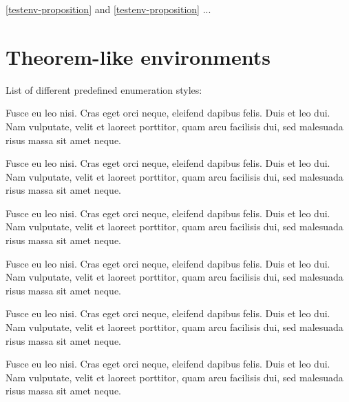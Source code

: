 \documentclass[a4paper,UKenglish,cleveref, autoref, thm-restate]{lipics-v2021}
\begin{document}
\cref{testenv-proposition} and \autoref{testenv-proposition} ...

\section{Theorem-like environments}\label{sec:theorem-environments}

List of different predefined enumeration styles:

\begin{theorem}\label{testenv-theorem}
Fusce eu leo nisi. Cras eget orci neque, eleifend dapibus felis. Duis et leo dui. Nam vulputate, velit et laoreet porttitor, quam arcu facilisis dui, sed malesuada risus massa sit amet neque.
\end{theorem}

\begin{lemma}\label{testenv-lemma}
Fusce eu leo nisi. Cras eget orci neque, eleifend dapibus felis. Duis et leo dui. Nam vulputate, velit et laoreet porttitor, quam arcu facilisis dui, sed malesuada risus massa sit amet neque.
\end{lemma}

\begin{corollary}\label{testenv-corollary}
Fusce eu leo nisi. Cras eget orci neque, eleifend dapibus felis. Duis et leo dui. Nam vulputate, velit et laoreet porttitor, quam arcu facilisis dui, sed malesuada risus massa sit amet neque.
\end{corollary}

\begin{proposition}\label{testenv-proposition}
Fusce eu leo nisi. Cras eget orci neque, eleifend dapibus felis. Duis et leo dui. Nam vulputate, velit et laoreet porttitor, quam arcu facilisis dui, sed malesuada risus massa sit amet neque.
\end{proposition}

\begin{conjecture}\label{testenv-conjecture}
Fusce eu leo nisi. Cras eget orci neque, eleifend dapibus felis. Duis et leo dui. Nam vulputate, velit et laoreet porttitor, quam arcu facilisis dui, sed malesuada risus massa sit amet neque.
\end{conjecture}

\begin{observation}\label{testenv-observation}
Fusce eu leo nisi. Cras eget orci neque, eleifend dapibus felis. Duis et leo dui. Nam vulputate, velit et laoreet porttitor, quam arcu facilisis dui, sed malesuada risus massa sit amet neque.
\end{observation}
\end{document}

